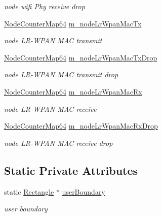 \begin{DoxyCompactItemize}
\begin{DoxyCompactList}\small\item\em node wifi Phy receive drop \end{DoxyCompactList}\item 
\hyperlink{classns3_1_1AnimationInterface_a8bd3daf0ee1a2bbebced596061bd012b}{Node\+Counter\+Map64} \hyperlink{classns3_1_1AnimationInterface_a412102b7354ebf1c0291feb0e8395df0}{m\+\_\+node\+Lr\+Wpan\+Mac\+Tx}
\begin{DoxyCompactList}\small\item\em node L\+R-\/\+W\+P\+AN M\+AC transmit \end{DoxyCompactList}\item 
\hyperlink{classns3_1_1AnimationInterface_a8bd3daf0ee1a2bbebced596061bd012b}{Node\+Counter\+Map64} \hyperlink{classns3_1_1AnimationInterface_a99c86fe6bda2666e92cd2e8d3f0a039b}{m\+\_\+node\+Lr\+Wpan\+Mac\+Tx\+Drop}
\begin{DoxyCompactList}\small\item\em node L\+R-\/\+W\+P\+AN M\+AC transmit drop \end{DoxyCompactList}\item 
\hyperlink{classns3_1_1AnimationInterface_a8bd3daf0ee1a2bbebced596061bd012b}{Node\+Counter\+Map64} \hyperlink{classns3_1_1AnimationInterface_a1dbba44b836c5c1b9416b2ff362a2b1d}{m\+\_\+node\+Lr\+Wpan\+Mac\+Rx}
\begin{DoxyCompactList}\small\item\em node L\+R-\/\+W\+P\+AN M\+AC receive \end{DoxyCompactList}\item 
\hyperlink{classns3_1_1AnimationInterface_a8bd3daf0ee1a2bbebced596061bd012b}{Node\+Counter\+Map64} \hyperlink{classns3_1_1AnimationInterface_ac14b6bc4b812888850e1bf09d0371041}{m\+\_\+node\+Lr\+Wpan\+Mac\+Rx\+Drop}
\begin{DoxyCompactList}\small\item\em node L\+R-\/\+W\+P\+AN M\+AC receive drop \end{DoxyCompactList}\end{DoxyCompactItemize}
\subsection*{Static Private Attributes}
\begin{DoxyCompactItemize}
\item 
static \hyperlink{classns3_1_1Rectangle}{Rectangle} $\ast$ \hyperlink{classns3_1_1AnimationInterface_a8ca1f63d8c4eadc9cd711b209e7d4002}{user\+Boundary}
\begin{DoxyCompactList}\small\item\em user boundary \end{DoxyCompactList}\end{DoxyCompactItemize}


